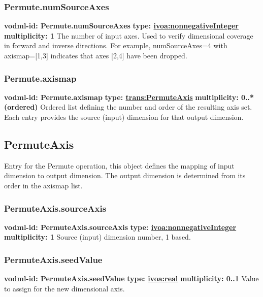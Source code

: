    \subsubsection{Permute.numSourceAxes}
      \textbf{vodml-id: Permute.numSourceAxes} \newline
      \textbf{type: \hyperref[sect:ivoa]{ivoa:nonnegativeInteger}} \newline
      \textbf{multiplicity: 1} \newline 
      The number of input axes. Used to verify dimensional coverage in forward and inverse directions. For example, numSourceAxes=4 with axismap=[1,3] indicates that axes [2,4] have been dropped.

    \subsubsection{Permute.axismap}
      \textbf{vodml-id: Permute.axismap} \newline
      \textbf{type: \hyperref[sect:PermuteAxis]{trans:PermuteAxis}} \newline
      \textbf{multiplicity: 0..*  (ordered)} \newline 
      Ordered list defining the number and order of the resulting axis set. Each entry provides the source (input) dimension for that output dimension.

  \subsection{PermuteAxis}
  \label{sect:PermuteAxis}
    Entry for the Permute operation, this object defines the mapping of input dimension to output dimension. The output dimension is determined from its order in the axismap list.

    \subsubsection{PermuteAxis.sourceAxis}
      \textbf{vodml-id: PermuteAxis.sourceAxis} \newline
      \textbf{type: \hyperref[sect:ivoa]{ivoa:nonnegativeInteger}} \newline
      \textbf{multiplicity: 1} \newline 
      Source (input) dimension number, 1 based.

    \subsubsection{PermuteAxis.seedValue}
      \textbf{vodml-id: PermuteAxis.seedValue} \newline
      \textbf{type: \hyperref[sect:ivoa]{ivoa:real}} \newline
      \textbf{multiplicity: 0..1} \newline 
      Value to assign for the new dimensional axis.


